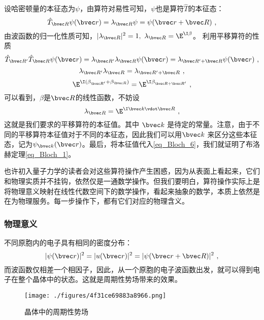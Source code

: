 设哈密顿量的本征态为$\psi$，由算符对易性可知，$\psi$也是算符$\hat{T}$的本征态：
\begin{equation}\label{eq_Bloch_6}
\hat{T}_{\bvec R} \psi (\bvec r) = \lambda_{\bvec R}\psi =\psi(\bvec r + \bvec R)~,
\end{equation}
由波函数的归一化性质可知，$|\lambda_{\bvec R} |^2 = 1,~ \lambda_{\bvec R} = \E^{\I \beta}$。 利用平移算符的性质
\begin{equation}
\hat{T}_{\bvec R'} \hat{T}_{\bvec R}\psi (\bvec r) = \lambda_{\bvec R'}\lambda_{\bvec R}\psi (\bvec r) = \lambda_{\bvec R' + \bvec R} \psi (\bvec r)~,
\end{equation}
\begin{equation}
\lambda_{\bvec R'}\lambda_{\bvec R} =  \lambda_{\bvec R' + \bvec R}~,
\end{equation}
\begin{equation}
\E^{\I (\beta_{\bvec R'}+ \beta_{\bvec R})} = \E^{\I \beta_{\bvec R + \bvec R'}}~,
\end{equation}
可以看到，$\beta$是$\bvec R$的线性函数，不妨设
\begin{equation}
\lambda_{\bvec R} = \E^{\I \bvec k \vdot  \bvec R}~,
\end{equation}
这就是我们要求的平移算符的本征值。其中 $\bvec k$ 是待定的常量。注意，由于不同的平移算符本征值对于不同的本征态，因此我们可以用$\bvec k$ 来区分这些本征态，记为$\psi_{\bvec k} (\bvec r)$。最后，将本征值代入\autoref{eq_Bloch_6}，我们就证明了布洛赫定理\autoref{eq_Bloch_1}。

也许初入量子力学的读者会对这些算符操作产生困惑，因为从表面上看起来，它们和物理实质并不挂钩，依然仅是一通数学操作。但我们要明白，算符操作实际上是将物理意义映射在线性代数空间下的数学操作，看起来抽象的数学，本质上依然是在为物理服务。每一步操作下，都有它们对应的物理含义。

\subsubsection{物理意义}
不同原胞内的电子具有相同的密度分布：
\begin{equation}
|\psi(\bvec r)|^2 = |u(\bvec r)|^2 = |\psi(\bvec r + \bvec R)|^2~,
\end{equation}
而波函数仅相差一个相因子，因此，从一个原胞的电子波函数出发，就可以得到电子在整个晶体中的状态。这就是周期性势场带来的效果。

\begin{figure}[ht]
\centering
\texttt{[image: ./figures/4f31ce69883a8966.png]}
\caption{晶体中的周期性势场} \label{fig_Bloch_2}
\end{figure}

